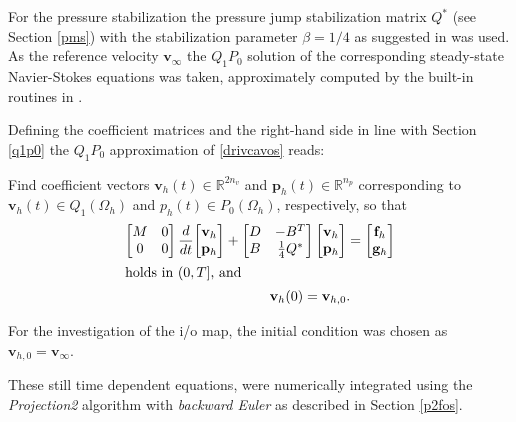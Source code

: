 \documentclass[a4paper,10pt,BCOR=15mm]{scrbook}
\begin{document}
For the pressure stabilization the pressure jump stabilization matrix $Q^*$ (see Section \ref{pms}) with the stabilization parameter $\beta = 1/4$ as suggested in \cite[p. 241]{elma} was used. As the reference velocity $\mathbf v_\infty$ the $Q_1P_0$ solution of the corresponding steady-state Navier-Stokes equations was taken, approximately computed by the built-in routines in \cite{ifis}.

Defining the coefficient matrices and the right-hand side in line with Section \ref{q1p0} the $Q_1P_0$ approximation of \eqref{drivcavos} reads: 

\begin{prob}

Find coefficient vectors $\mathbf v_h(t) \in \mathbb R^{2n_v}$ and $\mathbf p_h(t) \in \mathbb R^{n_p}$ corresponding to $\mathbf v_h(t) \in Q_1(\Omega_h)$ and $p_h(t) \in P_0(\Omega_h)$, respectively, so that
\begin{align}\label{algos1}
	\begin{bmatrix} M& 0 \\ 0& 0 \end{bmatrix} \frac{d}{dt} {\begin{bmatrix} \mathbf v_h \\ \mathbf p_h  \end{bmatrix}} + \begin{bmatrix} D& -B^T \\  B& \frac{1}{4}Q^* \end{bmatrix} \begin{bmatrix} \mathbf v_h \\ \mathbf p_h  \end{bmatrix} &= \begin{bmatrix} \mathbf f_h \\ \mathbf g_h \end{bmatrix} \\
\intertext{holds in $(0,T]$, and}
\mathbf v_h(0) = \mathbf v_{h,0}&.
\end{align}
\end{prob}

For the investigation of the i/o map, the initial condition was chosen as $\mathbf v_{h,0} = \mathbf v_\infty$.

These still time dependent equations, were numerically integrated using the \textit{Projection2} algorithm with \textit{backward Euler} as described in Section \ref{p2fos}.
\end{document}

